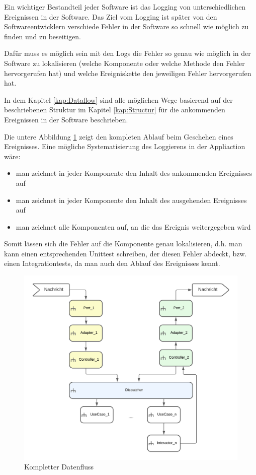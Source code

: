 Ein wichtiger Bestandteil jeder Software ist das Logging von unterschiedlichen Ereignissen in der Software.
Das Ziel vom Logging ist später von den Softwareentwicklern verschiede Fehler in der Software so schnell wie möglich zu finden und
zu beseitigen.

Dafür muss es möglich sein mit den Logs die Fehler so genau wie möglich in der Software zu lokalisieren 
(welche Komponente oder welche Methode den Fehler hervorgerufen hat) 
und welche Ereigniskette den jeweiligen Fehler hervorgerufen hat.

In dem Kapitel \ref{kap:Dataflow} sind alle möglichen Wege basierend auf der beschriebenen Struktur 
im Kapitel \ref{kap:Structur} für die ankommenden Ereignissen in der Software beschrieben.

Die untere Abbildung \ref{fig:FullDataFlow} zeigt den kompleten Ablauf beim Geschehen eines Ereignisses.
Eine mögliche Systematisierung des Loggierens in der Appliaction wäre: 
\begin{itemize}
    \item man zeichnet in jeder Komponente den Inhalt des ankommenden Ereignisses auf
    \item man zeichnet in jeder Komponente den Inhalt des ausgehenden Ereignisses auf
    \item man zeichnet alle Komponenten auf, an die das Ereignis weitergegeben wird
\end{itemize}

Somit lässen sich die Fehler auf die Komponente genau lokalisieren, d.h. man kann einen entsprechenden Unittest schreiben, 
der diesen Fehler abdeckt, bzw. einen Integrationtests, da man auch den Ablauf des Ereignisses kennt.

\begin{figure}[H]
    \centering
    \includegraphics[width=12cm]{./images/FullDataFlow.png}
     \caption[Kompletter Datenfluss]{Kompletter Datenfluss \footnotemark}
     \label{fig:FullDataFlow}
\end{figure}
